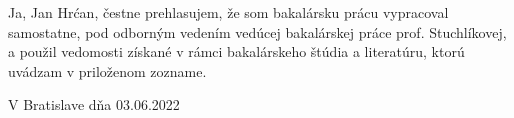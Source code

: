 Ja, Jan Hrćan, čestne prehlasujem, že som bakalársku prácu vypracoval samostatne, pod odborným vedením vedúcej bakalárskej práce prof. Stuchlíkovej, a použil vedomosti získané v rámci bakalárskeho štúdia a literatúru, ktorú uvádzam v priloženom zozname.


\noindent V Bratislave dňa 03.06.2022